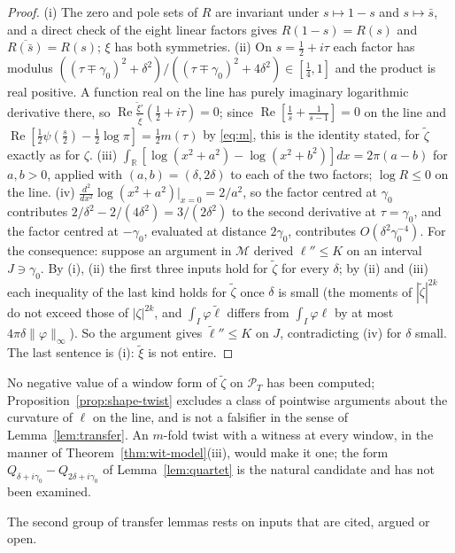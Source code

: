 \documentclass[11pt]{amsart}
\theoremstyle{definition}
\theoremstyle{remark}
\newcommand{\R}{\mathbb R}
\newcommand{\Rel}{\operatorname{Re}}
\newcommand{\PT}{\mathcal P_T}
\begin{document}
\begin{proof}
(i) The zero and pole sets of $R$ are invariant under $s\mapsto1-s$ and $s\mapsto\bar s$, and a direct check of the eight linear factors
gives $R(1-s)=R(s)$ and $\overline{R(\bar s)}=R(s)$; $\xi$ has both symmetries. (ii) On $s=\frac12+i\tau$ each factor has modulus
$((\tau\mp\gamma_0)^2+\delta^2)/((\tau\mp\gamma_0)^2+4\delta^2)\in[\frac14,1]$ and the product is real positive. A function real on the
line has purely imaginary logarithmic derivative there, so $\Rel\frac{\tilde\xi'}{\tilde\xi}(\frac12+i\tau)=0$; since
$\Rel[\frac1s+\frac1{s-1}]=0$ on the line and $\Rel[\frac12\psi(\frac s2)-\frac12\log\pi]=\frac12m(\tau)$ by \eqref{eq:m}, this is the
identity stated, for $\tilde\zeta$ exactly as for $\zeta$. (iii) $\int_\R[\log(x^2+a^2)-\log(x^2+b^2)]dx=2\pi(a-b)$ for $a,b>0$, applied
with $(a,b)=(\delta,2\delta)$ to each of the two factors; $\log R\le0$ on the line. (iv) $\frac{d^2}{dx^2}\log(x^2+a^2)|_{x=0}=2/a^2$, so
the factor centred at $\gamma_0$ contributes $2/\delta^2-2/(4\delta^2)=3/(2\delta^2)$ to the second derivative at $\tau=\gamma_0$, and the
factor centred at $-\gamma_0$, evaluated at distance $2\gamma_0$, contributes $O(\delta^2\gamma_0^{-4})$. For the consequence: suppose an
argument in $\mathcal M$ derived $\ell''\le K$ on an interval $J\ni\gamma_0$. By (i), (ii) the first three inputs hold for $\tilde\zeta$ for
every $\delta$; by (ii) and (iii) each inequality of the last kind holds for $\tilde\zeta$ once $\delta$ is small (the moments of
$|\tilde\zeta|^{2k}$ do not exceed those of $|\zeta|^{2k}$, and $\int_I\varphi\tilde\ell$ differs from $\int_I\varphi\ell$ by at most
$4\pi\delta\|\varphi\|_\infty$). So the argument gives $\tilde\ell''\le K$ on $J$, contradicting (iv) for $\delta$ small. The last
sentence is (i): $\tilde\xi$ is not entire.
\end{proof}

No negative value of a window form of $\tilde\zeta$ on $\PT$ has been computed; Proposition~\ref{prop:shape-twist} excludes a class of
pointwise arguments about the curvature of $\ell$ on the line, and is not a falsifier in the sense of Lemma~\ref{lem:transfer}. An
$m$-fold twist with a witness at every window, in the manner of Theorem~\ref{thm:wit-model}(iii), would make it one; the form
$Q_{\delta+i\gamma_0}-Q_{2\delta+i\gamma_0}$ of Lemma~\ref{lem:quartet} is the natural candidate and has not been examined.

The second group of transfer lemmas rests on inputs that are cited, argued or open.
\end{document}

